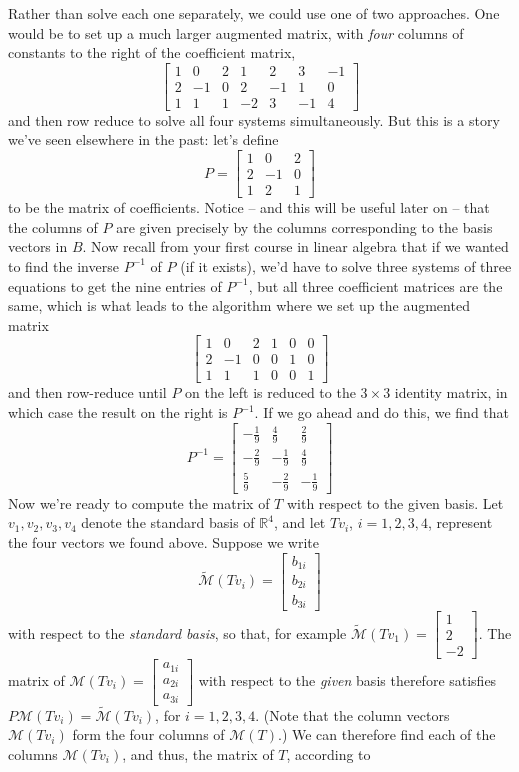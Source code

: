 \documentclass[12pt,letterpaper]{article}
\newcommand{\M}{\mathcal{M}}
\newcommand{\R}{\mathbb{R}}
\begin{document}
Rather than solve each one separately, we could use one of two approaches. One would be to set up a much larger augmented matrix, with {\em four} columns of constants to the right of the coefficient matrix,
\[
\left[\begin{array}{ccc|cccc}
1&0&2&1&2&3&-1\\
2&-1&0&2&-1&1&0\\1&1&1&-2&3&-1&4
\end{array}\right]
\]
 and then row reduce to solve all four systems simultaneously. But this is a story we've seen elsewhere in the past: let's define
\[
P = \begin{bmatrix}1&0&2\\2&-1&0\\1&2&1\end{bmatrix}
\]
to be the matrix of coefficients. Notice -- and this will be useful later on -- that the columns of $P$ are given precisely by the columns corresponding to the basis vectors in $B$. Now recall from your first course in linear algebra that if we wanted to find the inverse $P^{-1}$ of $P$ (if it exists), we'd have to solve three systems of three equations to get the nine entries of $P^{-1}$, but all three coefficient matrices are the same, which is what leads to the algorithm where we set up the augmented matrix
\[
\left[\begin{array}{ccc|ccc}
1&0&2&1&0&0\\
2&-1&0&0&1&0\\
1&1&1&0&0&1
\end{array}\right]
\]
and then row-reduce until $P$ on the left is reduced to the $3\times 3$ identity matrix, in which case the result on the right is $P^{-1}$. If we go ahead and do this, we find that
\[
P^{-1} = \begin{bmatrix}
-\frac{1}{9}&\frac{4}{9}&\frac{2}{9}\\
-\frac{2}{9}&-\frac{1}{9}&\frac{4}{9}\\
\frac{5}{9}&-\frac{2}{9}&-\frac{1}{9}
\end{bmatrix}
\]
Now we're ready to compute the matrix of $T$ with respect to the given basis. Let $v_1,v_2,v_3,v_4$ denote the standard basis of $\R^4$, and let $Tv_i$, $i=1,2,3,4$, represent the four vectors we found above. Suppose we write
\[
\tilde{\M}(Tv_i) = \begin{bmatrix}b_{1i}\\b_{2i}\\b_{3i}\end{bmatrix}
\]
with respect to the {\em standard basis}, so that, for example $\tilde{\M}(Tv_1) = \begin{bmatrix}1\\2\\-2\end{bmatrix}$. The matrix of $\M(Tv_i) = \begin{bmatrix}a_{1i}\\a_{2i}\\a_{3i}\end{bmatrix}$ with respect to the {\em given} basis therefore satisfies $P\M(Tv_i) = \tilde{\M}(Tv_i)$, for $i=1,2,3,4$. (Note that the column vectors $\M(Tv_i)$ form the four columns of $\M(T)$.) We can therefore find each of the columns $\M(Tv_i)$, and thus, the matrix of $T$, according to
\end{document}
